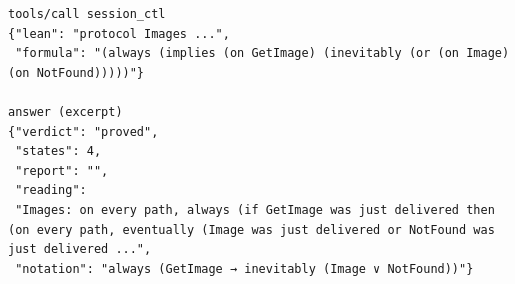 \begin{lstlisting}[language={},basicstyle=\ttfamily\footnotesize,breaklines=true]
tools/call session_ctl
{"lean": "protocol Images ...",
 "formula": "(always (implies (on GetImage) (inevitably (or (on Image) (on NotFound)))))"}

answer (excerpt)
{"verdict": "proved",
 "states": 4,
 "report": "",
 "reading":
 "Images: on every path, always (if GetImage was just delivered then (on every path, eventually (Image was just delivered or NotFound was just delivered ...",
 "notation": "always (GetImage → inevitably (Image ∨ NotFound))"}
\end{lstlisting}
